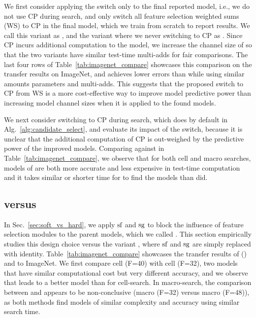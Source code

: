 We first consider applying the switch only to the final reported model, i.e., we do not use CP during search, and only switch all feature selection weighted sums (WS) to CP in the final model, which we train from scratch to report results. We call this variant as \PetridishCP, and the variant where we never switching to CP as \PetridishWS. Since CP incurs additional computation to the model, we increase the channel size of \PetridishWS so that the two variants have similar test-time multi-adds for fair comparisons. 
The last four rows of Table~\ref{tab:imagenet_compare} showcases this comparison on the transfer results on ImageNet, and \PetridishCP achieves lower errors than \PetridishWS while using similar amounts parameters and multi-adds. This suggests that the proposed switch to CP from WS is a more cost-effective way to improve model predictive power than increasing model channel sizes when it is applied to the found models.

We next consider switching to CP during search, which \Petridish does by default in Alg.~\ref{alg:candidate_select}, and evaluate its impact of the switch, because it is unclear that the additional computation of CP is out-weighed by the predictive power of the improved models. Comparing \PetridishCP against \Petridish in Table~\ref{tab:imagenet_compare}, we observe that for both cell and macro searches, models of \Petridish are both more accurate and less expensive in test-time computation and it takes similar or shorter time for \Petridish to find the models than \PetridishCP did. 




\subsection{\petridishhard versus \petridishsoft}
\label{sec:experiment_soft_vs_hard}

In Sec.~\ref{sec:soft_vs_hard}, we apply $\textrm{sf}$ and $\textrm{sg}$ to block the influence of feature selection modules to the parent models, which we called \petridishhard. This section empirically studies this design choice versus the variant \petridishsoft, where $\textrm{sf}$ and $\textrm{sg}$ are simply replaced with identity. Table~\ref{tab:imagenet_compare} showcases the transfer results of \petridishhard (\Petridish) and \petridishsoft to ImageNet. We first compare \Petridish cell (F=40) with \petridishsoft cell (F=32), two models that have similar computational cost but very different accuracy, and we observe that \petridishhard leads to a better model than \petridishsoft for cell-search. In macro-search, the comparison between \petridishhard and \petridishsoft appears to be non-conclusive (\Petridish macro (F=32) versus \petridishsoft macro (F=48)), as both methods find models of similar complexity and accuracy using similar search time. 


